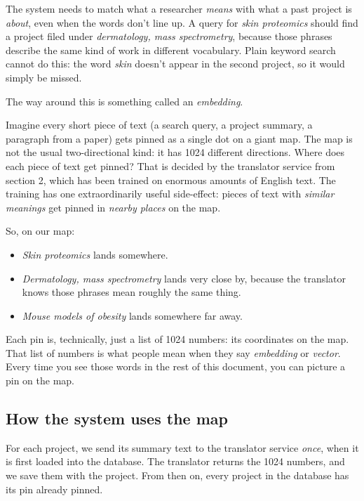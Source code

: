 \documentclass[11pt,a4paper]{article}
\begin{document}
The system needs to match what a researcher \emph{means} with what a past project is \emph{about}, even when the words don't line up. A query for \emph{skin proteomics} should find a project filed under \emph{dermatology, mass spectrometry}, because those phrases describe the same kind of work in different vocabulary. Plain keyword search cannot do this: the word \emph{skin} doesn't appear in the second project, so it would simply be missed.

The way around this is something called an \emph{embedding}.

\medskip

Imagine every short piece of text (a search query, a project summary, a paragraph from a paper) gets pinned as a single dot on a giant map. The map is not the usual two-directional kind: it has 1024 different directions. Where does each piece of text get pinned? That is decided by the translator service from section 2, which has been trained on enormous amounts of English text. The training has one extraordinarily useful side-effect: pieces of text with \emph{similar meanings} get pinned in \emph{nearby places} on the map.

So, on our map:

\begin{itemize}[leftmargin=2em,itemsep=2pt]
  \item \emph{Skin proteomics} lands somewhere.
  \item \emph{Dermatology, mass spectrometry} lands very close by, because the translator knows those phrases mean roughly the same thing.
  \item \emph{Mouse models of obesity} lands somewhere far away.
\end{itemize}

Each pin is, technically, just a list of 1024 numbers: its coordinates on the map. That list of numbers is what people mean when they say \emph{embedding} or \emph{vector}. Every time you see those words in the rest of this document, you can picture a pin on the map.

\subsection{How the system uses the map}

For each project, we send its summary text to the translator service \emph{once}, when it is first loaded into the database. The translator returns the 1024 numbers, and we save them with the project. From then on, every project in the database has its pin already pinned.
\end{document}
